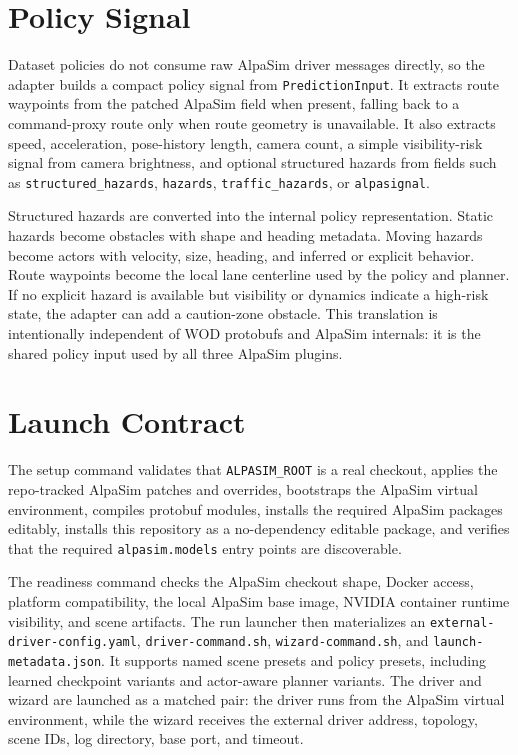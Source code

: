 \documentclass{article}
\begin{document}
\section{Policy Signal}

Dataset policies do not consume raw AlpaSim driver messages directly, so the adapter
builds a compact policy signal from \texttt{PredictionInput}. It extracts route
waypoints from the patched AlpaSim field when present, falling back to a command-proxy
route only when route geometry is unavailable. It also extracts speed, acceleration,
pose-history length, camera count, a simple visibility-risk signal from camera
brightness, and optional structured hazards from fields such as
\texttt{structured\_hazards}, \texttt{hazards}, \texttt{traffic\_hazards}, or
\texttt{alpasignal}.

Structured hazards are converted into the internal policy representation. Static hazards
become obstacles with shape and heading metadata. Moving hazards become actors with
velocity, size, heading, and inferred or explicit behavior. Route waypoints become the
local lane centerline used by the policy and planner. If no explicit hazard is available
but visibility or dynamics indicate a high-risk state, the adapter can add a caution-zone
obstacle. This translation is intentionally independent of WOD protobufs and AlpaSim
internals: it is the shared policy input used by all three AlpaSim plugins.

\section{Launch Contract}

The setup command validates that \texttt{ALPASIM\_ROOT} is a real checkout, applies the
repo-tracked AlpaSim patches and overrides, bootstraps the AlpaSim virtual environment,
compiles protobuf modules, installs the required AlpaSim packages editably, installs this
repository as a no-dependency editable package, and verifies that the required
\texttt{alpasim.models} entry points are discoverable.

The readiness command checks the AlpaSim checkout shape, Docker access, platform
compatibility, the local AlpaSim base image, NVIDIA container runtime visibility, and
scene artifacts. The run launcher then materializes an
\texttt{external-driver-config.yaml}, \texttt{driver-command.sh},
\texttt{wizard-command.sh}, and \texttt{launch-metadata.json}. It supports named scene
presets and policy presets, including learned checkpoint variants and actor-aware
planner variants. The driver and wizard are launched as a matched pair: the driver runs
from the AlpaSim virtual environment, while the wizard receives the external driver
address, topology, scene IDs, log directory, base port, and timeout.
\end{document}
